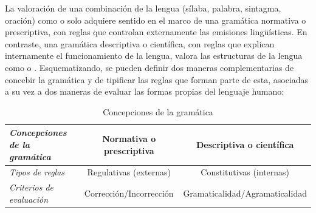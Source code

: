 La valoración de una combinación de la lengua (sílaba, palabra, sintagma,
oración) como  o  solo adquiere sentido en
el marco de una gramática normativa o prescriptiva, con reglas que controlan
externamente las emisiones lingüísticas. En contraste, una gramática
descriptiva o científica, con reglas que explican internamente el
funcionamiento de la lengua, valora las estructuras de la lengua como
 o . Esquematizando, se pueden
definir dos maneras complementarias de concebir la gramática y de tipificar las
reglas que forman parte de esta, asociadas a su vez a dos maneras de evaluar
las formas propias del lenguaje humano:

\begin{table}[htbp]
  \centering
  \begin{tabularx}{\linewidth}{@{}>{\itshape}l C C@{}}
    \toprule
    Concepciones de la gramática & Normativa o prescriptiva & Descriptiva o científica \\
    \midrule
    Tipos de reglas          & Regulativas (externas)  & Constitutivas (internas) \\
    Criterios de evaluación  & Corrección/\hspace{0pt}Incorrección & Gramaticalidad/\hspace{0pt}Agramaticalidad \\
    \bottomrule
  \end{tabularx}
  \caption{Concepciones de la gramática}\label{tab:02-concepciones}
\end{table}

